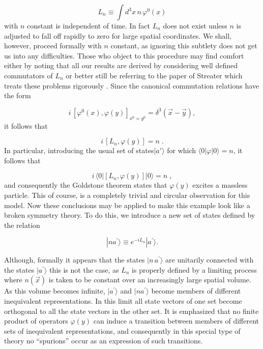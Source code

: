\documentclass[%
  12pt,
  paper=letter,
  abstracton,
  pagesize=auto,
  version=last,
  DIV=calc
  ]{scrartcl}
\begin{document}
\begin{equation*}
L_n\equiv \int d^3x \,n \,\varphi^{0}(x)
\end{equation*}
with $n$ constant is independent of time.  In fact $L_n$ does not
exist unless $n$ is adjusted to fall off rapidly to zero for large
spatial coordinates.  We shall, however, proceed formally with $n$
constant, as ignoring this subtlety does not get us into any
difficulties.  Those who object to this procedure may find comfort
either by noting that all our results are derived by considering well
defined commutators of $L_n$ or better still be referring to the paper
of Streater which treats these problems rigorously \cite{11}.  Since
the canonical commutation relations have the form

\begin{equation*}
i\, [\varphi^{0} (x), \varphi(y)]_{x^{0}=y^{0}} =  \delta^3(\vec{x} - \vec{y}),
\end{equation*}
it follows that

\begin{equation*}
i\, [L_n, \varphi(y)] = n \; .
\end{equation*}
In particular, introducing the usual set of states$|a'\rangle$ for which
$\langle 0|\varphi|0\rangle = n$, it follows that

\begin{equation*}
i\, \langle 0|[L_n, \varphi(y)]|0\rangle = n \; ,
\end{equation*}
and consequently the Goldstone theorem states that $\varphi(y)$
excites a massless particle.  This of course, is a completely trivial
and circular observation for this model.  Now these conclusions may be
applied to make this example look like a broken symmetry theory.  To
do this, we introduce a new set of states defined by the relation

\begin{equation*}
|n a^{\prime}\rangle \equiv e^{-i L_n} |a^{\prime}\rangle.
\end{equation*}

Although, formally it appears that the states $|n\, a^{\prime}\rangle$ are
unitarily connected with the states $|a^{\prime}\rangle$ this is not the
case, as $L_n$ is properly defined by a limiting process where
$n(\vec{x})$ is taken to be constant over an increasingly large
spatial volume.  As this volume becomes infinite, $|a^{\prime}\rangle$ and $|
n a^{\prime}\rangle$ become members of different inequivalent
representations.  In this limit all state vectors of one set become
orthogonal to all the state vectors in the other set.  It is
emphasized that no finite product of operators $\varphi(y)$ can induce
a transition between members of different sets of inequivalent
representations, and consequently in this special type of theory no
``spurions'' occur as an expression of such transitions.
\end{document}
